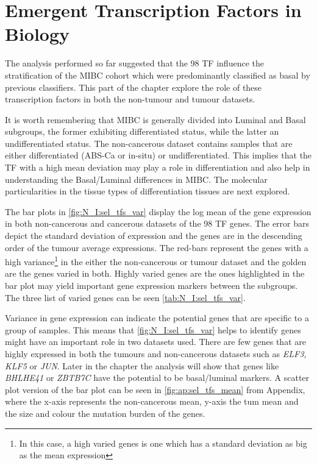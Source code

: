 \section{Emergent Transcription Factors in Biology} \label{s:N_I:sel_tfs_bio}

The analysis performed so far suggested that the 98 TF influence the stratification of the MIBC cohort which were predominantly classified as basal by previous classifiers. This part of the chapter explore the role of these transcription factors in both the non-tumour and tumour datasets.


It is worth remembering that MIBC is generally divided into Luminal and Basal subgroups, the former exhibiting differentiated status, while the latter an undifferentiated status. The non-cancerous dataset contains samples that are either differentiated (ABS-Ca or in-situ) or undifferentiated. This implies that the TF with a high mean deviation may play a role in differentiation and also help in understanding the Basal/Luminal differences in MIBC. The molecular particularities in the tissue types of differentiation tissues are next explored.


The bar plots in \cref{fig:N_I:sel_tfs_var} display the log mean of the gene expression in both non-cancerous and cancerous datasets of the 98 TF genes. The error bars depict the standard deviation of expression and the genes are in the descending order of the tumour average expressions. The red-bars represent the genes with a high variance\footnote{In this case, a high varied genes is one which has a standard deviation as big as the mean expression} in the either the non-cancerous or tumour dataset and the golden are the genes varied in both. Highly varied genes are the ones highlighted in the bar plot may yield important gene expression markers between the subgroups. The three list of varied genes can be seen \cref{tab:N_I:sel_tfs_var}.


Variance in gene expression can indicate the potential genes that are specific to a group of samples. This means that \cref{fig:N_I:sel_tfs_var} helps to identify genes might have an important role in two datasets used. There are few genes that are highly expressed in both the tumours and non-cancerous datasets such as \textit{ELF3, KLF5} or \textit{JUN}. Later in the chapter the analysis will show that genes like \textit{BHLHE41} or \textit{ZBTB7C} have the potential to be basal/luminal markers. A scatter plot version of the bar plot can be seen in \cref{fig:ap:sel_tfs_mean} from Appendix, where the x-axis represents the non-cancerous mean, y-axis the tum mean and the size and colour the mutation burden of the genes.



